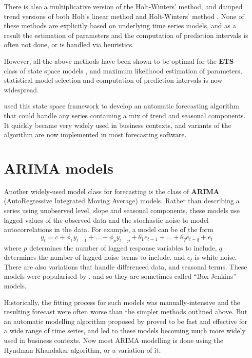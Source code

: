 \documentclass[a4paper,10pt]{article}
\begin{document}
There is also a multiplicative version of the Holt-Winters' method, and damped trend versions of both Holt's linear method and Holt-Winters' method \citep{fpp3}. None of these methods are explicitly based on underlying time series models, and as a result the estimation of parameters and the computation of prediction intervals is often not done, or is handled via heuristics.

However, all the above methods have been shown to be optimal for the \textbf{ETS} class of state space models \citep{expsmooth08}, and maximum likelihood estimation of parameters, statistical model selection and computation of prediction intervals is now widespread.

\citet{HKSG02} used this state space framework to develop an automatic forecasting algorithm that could handle any series containing a mix of trend and seasonal components. It quickly became very widely used in business contexts, and variants of the algorithm are now implemented in most forecasting software.

\section{ARIMA models}

Another widely-used model class for forecasting is the class of \textbf{ARIMA} (AutoRegressive Integrated Moving Average) models. Rather than describing a series using unobserved level, slope and seasonal components, these models use lagged values of the observed data and the stochastic noise to model autocorrelations in the data. For example, a model can be of the form
$$y_t = c + \phi_1y_{t-1} + \dots + \phi_py_{t-p} + \theta_1e_{t-1} + \dots + \theta_qe_{t-q} + e_t$$
where $p$ determines the number of lagged response variables to include, $q$ determines the number of lagged noise terms to include, and $e_t$ is white noise. There are also variations that handle differenced data, and seasonal terms. These models were popularised by \citet{BJ70}, and so they are sometimes called ``Box-Jenkins'' models.

Historically, the fitting process for such models was manually-intensive and the resulting forecast were often worse than the simpler methods outlined above. But an automatic modelling algorithm proposed by \citet{HK08} proved to be fast and effective for a wide range of time series, and led to these models becoming much more widely used in business contexts. Now most ARIMA modelling is done using the Hyndman-Khandakar algorithm, or a variation of it.
\end{document}
